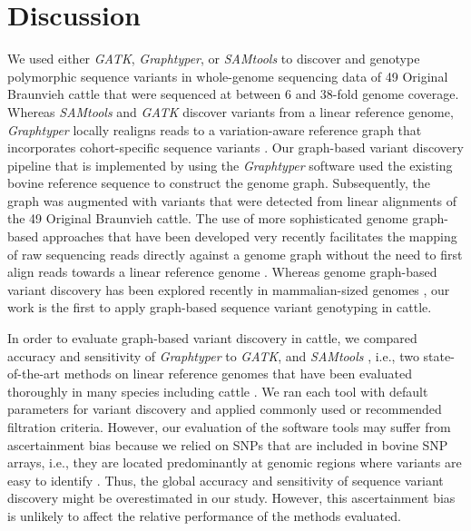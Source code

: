 \documentclass[../main.tex]{subfiles}
\begin{document}
\section{Discussion}

We used either \emph{GATK}, \emph{Graphtyper}, or \emph{SAMtools} to discover and genotype polymorphic sequence variants in whole-genome sequencing data of 49 Original Braunvieh cattle that were sequenced at between 6 and 38-fold genome coverage. 
Whereas \emph{SAMtools} and \emph{GATK} discover variants from a linear reference genome, \emph{Graphtyper} locally realigns reads to a variation-aware reference graph that incorporates cohort-specific sequence variants \citep{eggertsson2017graphtyper}. 
Our graph-based variant discovery pipeline that is implemented by using the \emph{Graphtyper} software used the existing bovine reference sequence to construct the genome graph. 
Subsequently, the graph was augmented with variants that were detected from linear alignments of the 49 Original Braunvieh cattle. 
The use of more sophisticated genome graph-based approaches that have been developed very recently facilitates the mapping of raw sequencing reads directly against a genome graph without the need to first align reads towards a linear reference genome \citep{garrison2018variation}. 
Whereas genome graph-based variant discovery has been explored recently in mammalian-sized genomes \citep{Dilthey2015,rakocevic2019fast,garrison2018variation,sibbesen2018accurate}, our work is the first to apply graph-based sequence variant genotyping in cattle.

In order to evaluate graph-based variant discovery in cattle, we compared accuracy and sensitivity of \emph{Graphtyper} to \emph{GATK}, and \emph{SAMtools} , i.e., two state-of-the-art methods on linear reference genomes that have been evaluated thoroughly in many species including cattle \citep{Jansen2013,baes2014evaluation}. 
We ran each tool with default parameters for variant discovery and applied commonly used or recommended filtration criteria. 
However, our evaluation of the software tools may suffer from ascertainment bias because we relied on SNPs that are included in bovine SNP arrays, i.e., they are located predominantly at genomic regions where variants are easy to identify \citep{li2014toward,malomane2018efficiency,linderman2014analytical}. 
Thus, the global accuracy and sensitivity of sequence variant discovery might be overestimated in our study. 
However, this ascertainment bias is unlikely to affect the relative performance of the methods evaluated.
\end{document}
